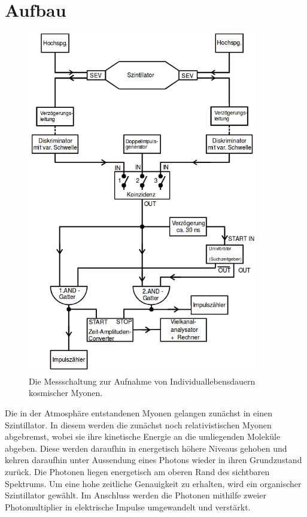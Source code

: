 \section{Aufbau}
\label{sec:Aufbau}
\begin{figure}
    \centering
    \includegraphics[width=0.9\textwidth]{content/images/AufbauV01.png}
    \caption{Die Messschaltung zur Aufnahme von Individuallebensdauern kosmischer Myonen.}
    \label{fig:Aufbau}
    \end{figure}
 Die in der Atmosphäre entstandenen Myonen gelangen zunächst in einen Szintillator. In diesem werden die zunächst noch relativistischen Myonen abgebremst, wobei sie ihre kinetische Energie an die umliegenden Moleküle abgeben. Diese werden daraufhin in energetisch höhere Niveaus gehoben und kehren daraufhin unter Aussendung eines Photons wieder in ihren Grundzustand zurück. Die Photonen liegen energetisch am oberen Rand des sichtbaren Spektrums. Um eine hohe zeitliche Genauigkeit zu erhalten, wird ein organischer Szintillator gewählt. Im Anschluss werden die Photonen mithilfe zweier Photomultiplier in elektrische Impulse umgewandelt und verstärkt.
